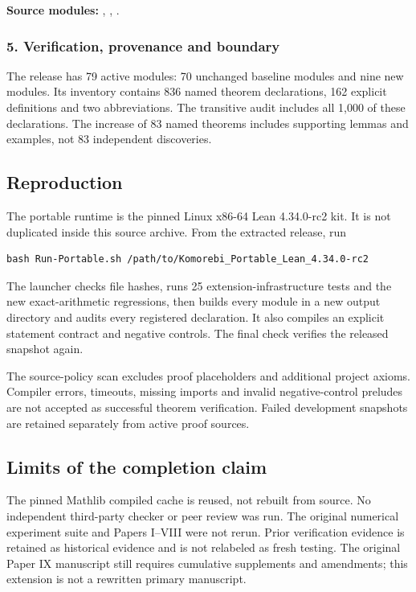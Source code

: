 \textbf{Source modules:} , , .

\par\medskip
\subsubsection*{5. Verification, provenance and boundary}
The release has 79 active modules: 70 unchanged baseline modules and nine new modules. Its inventory contains 836 named theorem declarations, 162 explicit definitions and two abbreviations. The transitive audit includes all 1,000 of these declarations. The increase of 83 named theorems includes supporting lemmas and examples, not 83 independent discoveries.



\subsection*{Reproduction}
The portable runtime is the pinned Linux x86-64 Lean 4.34.0-rc2 kit. It is not duplicated inside this source archive. From the extracted release, run
\begin{verbatim}
bash Run-Portable.sh /path/to/Komorebi_Portable_Lean_4.34.0-rc2
\end{verbatim}
The launcher checks file hashes, runs 25 extension-infrastructure tests and the new exact-arithmetic regressions, then builds every module in a new output directory and audits every registered declaration. It also compiles an explicit statement contract and negative controls. The final check verifies the released snapshot again.

The source-policy scan excludes proof placeholders and additional project axioms. Compiler errors, timeouts, missing imports and invalid negative-control preludes are not accepted as successful theorem verification. Failed development snapshots are retained separately from active proof sources.

\subsection*{Limits of the completion claim}
The pinned Mathlib compiled cache is reused, not rebuilt from source. No independent third-party checker or peer review was run. The original numerical experiment suite and Papers I--VIII were not rerun. Prior verification evidence is retained as historical evidence and is not relabeled as fresh testing. The original Paper IX manuscript still requires cumulative supplements and amendments; this extension is not a rewritten primary manuscript.

